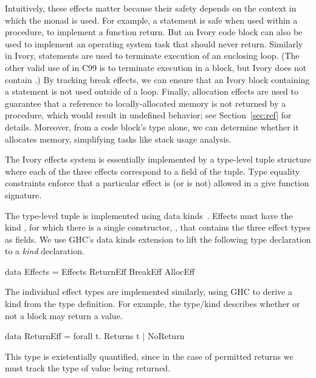Intuitively, these effects matter because their safety depends on the context in
which the monad is used. For example, a  statement is safe when used
within a procedure, to implement a function return. But an Ivory code block can
also be used to implement an operating system task that should never
return. Similarly in Ivory,  statements are used to terminate
execution of an enclosing loop. (The other valid use of  in C99 is to
terminate execution in a  block, but Ivory does not contain
.) By tracking break effects, we can ensure that an Ivory block
containing a  statement is not used outside of a loop. Finally,
allocation effects are used to guarantee that a reference to locally-allocated
memory is not returned by a procedure, which would result in undefined behavior; see
Section~\ref{sec:ref} for details. Moreover, from a code block's type alone, we
can determine whether it allocates memory, simplifying tasks like stack usage
analysis.

The Ivory effects system is essentially implemented by a type-level tuple
structure where each of the three effects correspond to a field of the
tuple. Type equality constraints enforce that a particular effect is (or is not)
allowed in a give function signature.

The type-level tuple is implemented using data kinds~\cite{data-kinds}. Effects
must have the kind , for which there is a single constructor,
, that contains the three effect types as fields.  We use GHC's data
kinds extension to lift the following type declaration to a \emph{kind} declaration.

\begin{code}
data Effects = Effects ReturnEff BreakEff AllocEff
\end{code}

\noindent
The individual effect types are implemented similarly, using GHC to derive a
kind from the type definition. For example, the  type/kind
describes whether or not a block may return a value.

\begin{code}
data ReturnEff = forall t. Returns t | NoReturn
\end{code}

\noindent
This type is existentially quantified, since in the case of permitted returns we
must track the type of value being returned.

